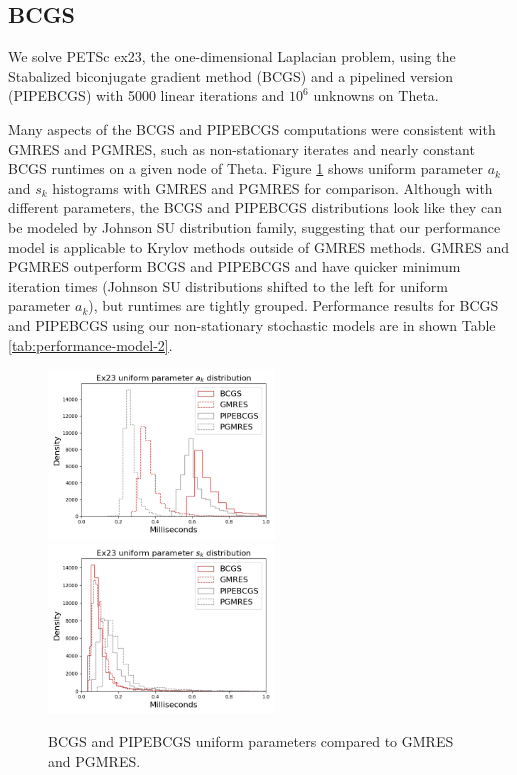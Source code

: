 \documentclass[sigconf, anonymous]{acmart}
\begin{document}
\subsection{BCGS}\label{sec:bcgs}

We solve PETSc ex23, the one-dimensional Laplacian problem, using the Stabalized biconjugate gradient method (BCGS) and a pipelined version (PIPEBCGS) with 5000 linear iterations and $10^6$ unknowns on Theta.  

Many aspects of the BCGS and PIPEBCGS computations were consistent with GMRES and PGMRES, such as non-stationary iterates and nearly constant BCGS runtimes on a given node of Theta. 
Figure \ref{fig:bcgs} shows uniform parameter $a_k$ and $s_k$ histograms with GMRES and PGMRES for comparison. 
Although with different parameters, the BCGS and PIPEBCGS distributions look like they can be modeled by Johnson SU distribution family, 
suggesting that our performance model is applicable to Krylov methods outside of GMRES methods.
GMRES and PGMRES outperform BCGS and PIPEBCGS and have quicker minimum iteration times (Johnson SU distributions shifted to the left for uniform parameter $a_k$), but runtimes are  tightly grouped.
Performance results for BCGS and PIPEBCGS using our non-stationary stochastic models are in shown Table \ref{tab:performance-model-2}.


\begin{figure}[t]
\centering
\includegraphics[width=6cm]{../plots/BCGS_GMRES_PIPEBCGS_PGMRES_ex23_8192_1000000_uniform_a_k.png} 
\includegraphics[width=6cm]{../plots/BCGS_GMRES_PIPEBCGS_PGMRES_ex23_8192_1000000_uniform_s_k.png}
\caption{BCGS and PIPEBCGS uniform parameters compared to GMRES and PGMRES.} \label{fig:bcgs}
\end{figure}
\end{document}
